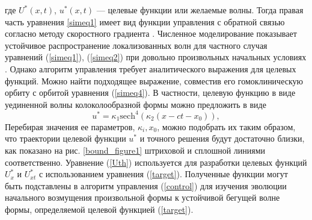 где $U^*(x, t)$, $u^*(x, t)$ --- целевые функции или желаемые волны. Тогда правая часть уравнения \ref{simeq1} имеет вид функции управления с обратной связью согласно методу скоростного градиента \cite{bound_fradkov, porant16, bound_porandr17, porant17}. Численное моделирование показывает устойчивое распространение локализованных волн для частного случая уравнений (\ref{simeq1}), (\ref{simeq2}) при довольно произвольных начальных условиях \cite{porant17}. Однако алгоритм управления требует аналитического выражения для целевых функций. Можно найти подходящее выражение, совместив его гомоклиническую орбиту с орбитой уравнения (\ref{simeq4}). 
В частности, целевую функцию в виде уединенной волны колоколообразной формы можно предложить в виде
\begin{equation}
	u^*=\kappa_1 {\text{sech}}^4 (\kappa_2(x- c t- x_0)), \label{target}
\end{equation}
Перебирая значения ее параметров, $\kappa_i, x_0$, можно подобрать их таким образом, что траектории целевой функции $u^*$ и точного решения будут достаточно близки, как показано на рис. \ref{bound_figure1} штриховой и сплошной линиями соответственно. Уравнение (\ref{Uth}) используется для разработки целевых функций $U^*_x$ и $U^*_{xt} $ с использованием уравнения (\ref{target}). Полученные функции могут быть подставлены в алгоритм управления (\ref{control}) для изучения эволюции начального возмущения произвольной формы к устойчивой бегущей волне формы, определяемой целевой функцией (\ref{target}).

